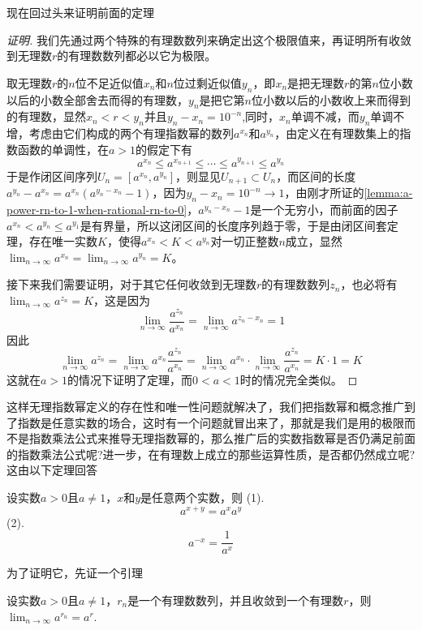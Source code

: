 现在回过头来证明前面的定理
\begin{proof}[证明]
  我们先通过两个特殊的有理数数列来确定出这个极限值来，再证明所有收敛到无理数$r$的有理数数列都必以它为极限。

  取无理数$r$的$n$位不足近似值$x_n$和$n$位过剩近似值$y_n$，即$x_n$是把无理数$r$的第$n$位小数以后的小数全部舍去而得的有理数，$y_n$是把它第$n$位小数以后的小数收上来而得到的有理数，显然$x_n<r<y_n$并且$y_n-x_n=10^{-n}$,同时，$x_n$单调不减，而$y_n$单调不增，考虑由它们构成的两个有理指数幂的数列$a^{x_n}$和$a^{y_n}$，由定义在有理数集上的指数函数的单调性，在$a>1$的假定下有
  \[ a^{x_n} \leqslant a^{x_{n+1}} \leqslant \cdots \leqslant a^{y_{n+1}} \leqslant a^{y_n} \]
  于是作闭区间序列$U_n = [a^{x_n},a^{y_n}]$，则显见$U_{n+1} \subset U_n$，而区间的长度$a^{y_n}-a^{x_n}=a^{x_n}(a^{y_n-x_n}-1)$，因为$y_n-x_n=10^{-n} \to 1$，由刚才所证的\autoref{lemma:a-power-rn-to-1-when-rational-rn-to-0}，$a^{y_n-x_n}-1$是一个无穷小，而前面的因子$a^{x_n}<a^{y_n} \leqslant a^{y_1}$是有界量，所以这闭区间的长度序列趋于零，于是由闭区间套定理，存在唯一实数$K$，使得$a^{x_n}<K<a^{y_n}$对一切正整数$n$成立，显然$\lim_{n \to \infty}a^{x_n} = \lim_{n \to \infty}a^{y_n}=K$。

  接下来我们需要证明，对于其它任何收敛到无理数$r$的有理数数列$z_n$，也必将有$\lim_{n \to \infty}a^{z_n}=K$，这是因为
  \[ \lim_{n \to \infty} \frac{a^{z_n}}{a^{x_n}} = \lim_{n \to \infty} a^{z_n-x_n} = 1 \]
  因此
  \[ \lim_{n \to \infty} a^{z_n} = \lim_{n \to \infty} a^{x_n} \frac{a^{z_n}}{a^{x_n}} = \lim_{n \to \infty} a^{x_n} \cdot \lim_{n \to \infty} \frac{a^{z_n}}{a^{x_n}} = K \cdot 1 = K \]
  这就在$a>1$的情况下证明了定理，而$0<a<1$时的情况完全类似。
\end{proof}

这样无理指数幂定义的存在性和唯一性问题就解决了，我们把指数幂和概念推广到了指数是任意实数的场合，这时有一个问题就冒出来了，那就是我们是用的极限而不是指数乘法公式来推导无理指数幂的，那么推广后的实数指数幂是否仍满足前面的指数乘法公式呢?进一步，在有理数上成立的那些运算性质，是否都仍然成立呢? 这由以下定理回答
\begin{theorem}
  \label{theorem:real-exponent-compute-rule}
  设实数$a>0$且$a \neq 1$，$x$和$y$是任意两个实数，则
  (1).
  \[ a^{x+y} = a^xa^y \]
  (2).
  \[ a^{-x} = \frac{1}{a^x} \]
\end{theorem}

为了证明它，先证一个引理
\begin{lemma}
  \label{lemma:a-power-rn-to-a-pow-r-when-rational-rn-to-rational-r}
  设实数$a>0$且$a \neq 1$，$r_n$是一个有理数数列，并且收敛到一个有理数$r$，则$\lim_{n \to \infty} a^{r_n} = a^{r}$.
\end{lemma}

